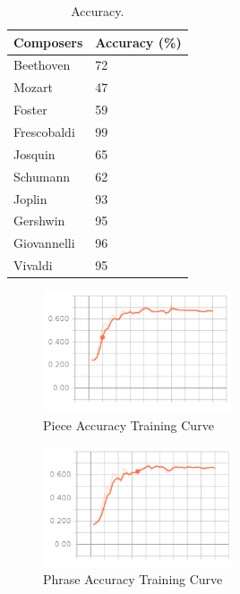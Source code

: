 \documentclass[11pt,a4paper]{article}
\begin{document}

\begin{table}[t!]
\begin{center}
\begin{tabular}{|l|l|}
\hline \bf Composers & \bf Accuracy (\%)\\ \hline
Beethoven & 72 \\
Mozart & 47\\
Foster & 59\\
Frescobaldi & 99\\
Josquin & 65\\
Schumann & 62\\
Joplin & 93\\
Gershwin & 95\\
Giovannelli & 96\\
Vivaldi & 95  \\
\hline
\end{tabular}
\end{center}
\caption{\label{test-accuracy-table}Accuracy. }
\end{table}


\begin{figure}[h]
\caption{Piece Accuracy Training Curve}
\centering
\includegraphics[width=0.5\textwidth]{Gaccuracy.png}
\end{figure}

\begin{figure}[h]
\caption{Phrase Accuracy Training Curve}
\centering
\includegraphics[width=0.5\textwidth]{vaccuracy.png}
\end{figure}
\end{document}
